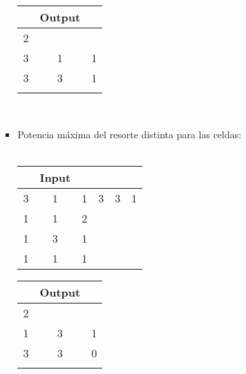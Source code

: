 \documentclass[11pt, a4paper, twoside]{article}
\begin{document}
\begin{itemize}
\begin{itemize}
\begin{itemize}
\begin{minipage}{0.3\textwidth}
\begin{tabular}{ccc}
								   & Output \\
								   \hline
								   2 &   &   \\
								   3 & 1 & 1 \\
								   3 & 3 & 1 \\
								   \\
							\end{tabular}
					    \end{minipage} 	\\
				\item Potencia máxima del resorte distinta para las celdas: \\
				\\
					\begin{minipage}{0.4\textwidth}
								\begin{tabular}{cccccc}
								 & Input \\
								   \hline
								   3 & 1 & 1 & 3 & 3 & 1\\
								   1 & 1 & 2 &   &   &  \\
								   1 & 3 & 1 &   &   &  \\
								   1 & 1 & 1 &   &   &  \\
								\end{tabular}
							\end{minipage} 
								\begin{minipage}{0.3\textwidth}
									\begin{tabular}{ccc}
									  & Output \\
									   \hline
									   2 &   &   \\
									   1 & 3 & 1 \\
									   3 & 3 & 0 \\
									   \\
								\end{tabular}
					\end{minipage} \\
					\\
					

\end{itemize}
\end{itemize}
\end{itemize}
\end{document}
